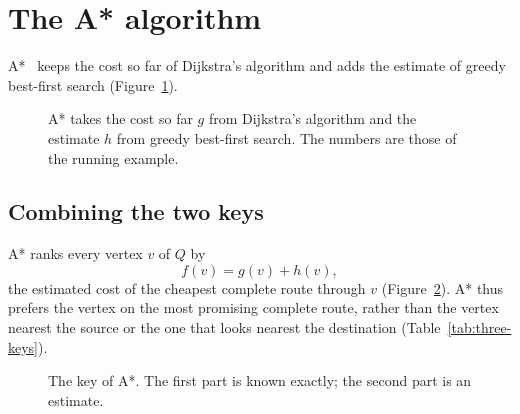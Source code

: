 \section{The A* algorithm}\label{sec:astar}

A*~\cite{hart1968formal} keeps the cost so far of Dijkstra's algorithm and adds
the estimate of greedy best-first search (Figure~\ref{fig:combine}).

\begin{figure}[htbp]
  \centering
  
  \caption{A* takes the cost so far $g$ from Dijkstra's algorithm and the
    estimate $h$ from greedy best-first search. The numbers are those of the
    running example.}\label{fig:combine}
\end{figure}

\subsection{Combining the two keys}\label{sec:fgh}

A* ranks every vertex $v$ of $Q$ by
\begin{equation}\label{eq:f}
  f(v) = g(v) + h(v),
\end{equation}
the estimated cost of the cheapest complete route through $v$
(Figure~\ref{fig:fgh}). A* thus prefers the vertex on the most promising
complete route, rather than the vertex nearest the source or the one that looks
nearest the destination (Table~\ref{tab:three-keys}).

\begin{figure}[htbp]
  \centering
  \caption{The key of A*. The first part is known exactly; the second part is
    an estimate.}\label{fig:fgh}
\end{figure}

